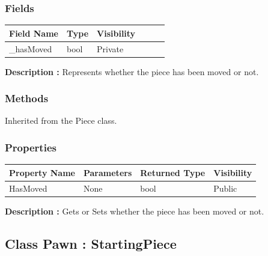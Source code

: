 \documentclass[12pt]{article}
\begin{document}
\subsubsection{Fields}

\begin{table}[H]
    \begin{tabular}{llllll}
    \hline
    \multicolumn{1}{|l|}{\cellcolor[HTML]{EFEFEF}\textbf{Field Name}} & \multicolumn{1}{l|}{\cellcolor[HTML]{EFEFEF}\textbf{Type}} & \multicolumn{1}{l|}{\cellcolor[HTML]{EFEFEF}\textbf{Visibility}} \\ \hline
    \multicolumn{1}{|l|}{\_hasMoved}                                  & \multicolumn{1}{l|}{bool}                                & \multicolumn{1}{l|}{Private}                                     \\ \hline
    \end{tabular}
\end{table}

\textbf{Description :} Represents whether the piece has been moved or not.

\subsubsection{Methods}
    Inherited from the Piece class.
\subsubsection{Properties}

\begin{table}[H]
    \begin{tabular}{|l|l|l|l|}
    \hline
    \rowcolor[HTML]{EFEFEF} 
    \cellcolor[HTML]{EFEFEF}\textbf{Property Name} & \textbf{Parameters}  & \textbf{Returned Type} & \textbf{Visibility} \\ \hline
    HasMoved                                       & None                 & bool                   & Public              \\ \hline
    \end{tabular}
\end{table}

    \textbf{Description :} Gets or Sets whether the piece has been moved or not.
\newpage


\subsection{Class Pawn : StartingPiece}
\end{document}
